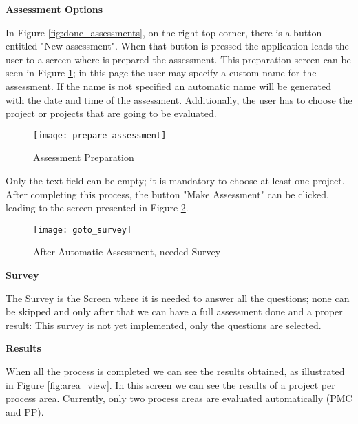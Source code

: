 \vspace{10 mm}

\textbf{Assessment Options}

In Figure \ref{fig:done_assessments}, on the right top corner, there is a button entitled "New assessment". When that button is pressed the application leads the user to a screen where is prepared the assessment. This preparation screen can be seen in Figure \ref{fig:prepare_assessment}; in this page the user may specify a custom name for the assessment. If the name is not specified an automatic name will be generated with the date and time of the assessment. Additionally, the user has to choose the project or projects that are going to be evaluated.

\begin{figure}[!htb]
	\begin{center}
		\leavevmode
		\texttt{[image: prepare\_assessment]}
		\caption{Assessment Preparation}
		\label{fig:prepare_assessment}
	\end{center}
\end{figure}

Only the text field can be empty; it is mandatory to choose at least one project. After completing this process, the button "Make Assessment" can be clicked, leading to the screen presented in Figure \ref{fig:goto_survey}.

\vspace{10 mm}
\newpage
\begin{figure}[!htb]
	\begin{center}
		\leavevmode
		\texttt{[image: goto\_survey]}
		\caption{After Automatic Assessment, needed Survey}
		\label{fig:goto_survey}
	\end{center}
\end{figure}

\textbf{Survey}

The Survey is the Screen where it is needed to answer all the questions; none can be skipped and only after that we can have a full assessment done and a proper result: This survey is not yet implemented, only the questions are selected.

\vspace{10 mm}

\newpage
\textbf{Results}

When all the process is completed we can see the results obtained, as illustrated in Figure \ref{fig:area_view}. In this screen we can see the results of a project per process area. Currently, only two process areas are evaluated automatically (PMC and PP).

